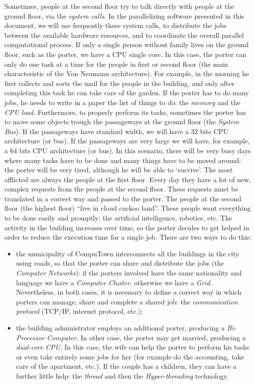 \documentclass[12pt,a4paper,pdftex]{article}
\begin{document}
Sometimes, people at the second floor try to talk directly with people at the ground floor, via the \emph{system calls}. In the parallelizing software presented in this document, we will use frequently these system calls, to distribute the jobs between the available hardware resources, and to coordinate the overall parallel computational process.
If only a single person without family lives on the ground floor, such as the porter, we have a CPU single core.
In this case, the porter can only do one task at a time for the people in first or second floor (the main characteristic of the Von Neumann architecture). For example, in the morning he first collects and sorts the mail for the people in the building, and only after completing this task he can take care of the garden.
If the porter has to do many jobs, he needs to write in a paper the list of things to do: the \emph{memory} and the \emph{CPU load}. Furthermore, to properly perform its tasks, sometimes the porter has to move some objects trough the passageways at the ground floor (the \emph{System Bus}). If the passageways have standard width, we will have a 32 bits CPU architecture (or bus). If the passageways are very large we will have, for example, a 64 bits CPU architecture (or bus).
In this scenario, there will be very busy days where many tasks have to be done and many things have to be moved around: the porter will be very tired, although he will be able to `survive'. The most afflicted are always the people at the first floor. Every day they have a lot of new, complex requests from the people at the second floor. These requests must be translated in a correct way and passed to the porter.
The people at the second floor (the highest floor) ``live in cloud cuckoo land''. These people want everything to be done easily and promptly: the artificial intelligence, robotics, etc.
The activity in the building increases over time, so the porter decides to get helped in order to reduce the execution time for a single job. There are two ways to do this:
\begin{itemize}
\item the municipality of CompuTown interconnects all the buildings in the city using roads, so that the porter can share and distribute the jobs (the \emph{Computer Networks}): if the porters involved have the same nationality and language we have a \emph{Computer Cluster}, otherwise we have a \emph{Grid}. Nevertheless, in both cases, it is necessary to define a correct way in which porters can manage, share and complete a shared job: the \emph{communication protocol} (TCP/IP, internet protocol, etc.);
\item the building administrator employs an additional porter, producing a \emph{Bi-Processor Computer}. In other case, the porter may get married, producing a \emph{dual-core CPU}. In this case, the wife can help the porter to perform his tasks or even take entirely some jobs for her (for example do the accounting, take care of the apartment, etc.). If the couple has a children, they can have a further little help: the \emph{thread} and then the \emph{Hyper-threading} technology.
\end{itemize}
\end{document}
